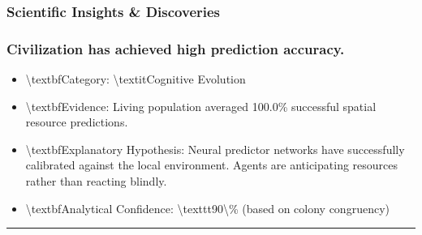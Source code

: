 \documentclass[11pt,a4paper]{article}
\begin{document}
\subsubsection*{ Scientific Insights \& Discoveries}
\subsubsection*{ Civilization has achieved high prediction accuracy.}
\begin{itemize}
  \item \textbackslash{}textbf{Category:} \textbackslash{}textit{Cognitive Evolution}
  \item \textbackslash{}textbf{Evidence:} Living population averaged 100.0\% successful spatial resource predictions.
  \item \textbackslash{}textbf{Explanatory Hypothesis:} Neural predictor networks have successfully calibrated against the local environment. Agents are anticipating resources rather than reacting blindly.
  \item \textbackslash{}textbf{Analytical Confidence:} \textbackslash{}texttt{90\textbackslash{}\%} (based on colony congruency)
\end{itemize}

\noindent\rule{\textwidth}{0.4pt}
\end{document}
